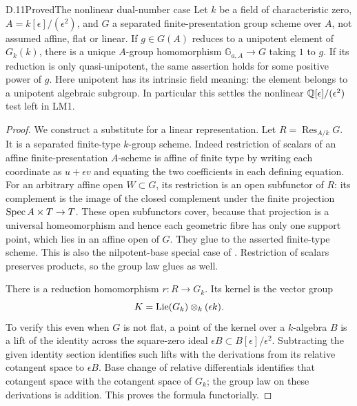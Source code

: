 \begin{statement}{D.11}{Proved}{The nonlinear dual-number case}
Let $k$ be a field of characteristic zero,
$A=k[\epsilon]/(\epsilon^2)$, and $G$ a separated
finite-presentation group scheme over $A$, not assumed
affine, flat or linear. If $g\in G(A)$ reduces to a
unipotent element of $G_k(k)$, there is a unique
$A$-group homomorphism $\mathbb G_{a,A}\to G$ taking $1$ to $g$.
If its reduction is only quasi-unipotent, the same
assertion holds for some positive power of $g$.
Here unipotent has its intrinsic field meaning:
the element belongs to a unipotent algebraic subgroup.
In particular this settles the nonlinear
$\mathbb Q[\epsilon]/(\epsilon^2)$ test left in LM1.
\end{statement}
\begin{proof}
We construct a substitute for a linear representation.
Let $R=\operatorname{Res}_{A/k}G$. It is a separated
finite-type $k$-group scheme. Indeed restriction of
scalars of an affine finite-presentation $A$-scheme
is affine of finite type by writing each coordinate
as $u+\epsilon v$ and equating the two coefficients
in each defining equation. For an arbitrary affine
open $W\subset G$, its restriction is an open
subfunctor of $R$: its complement is the image of
the closed complement under the finite projection
$\operatorname{Spec} A\times T\to T$. These open subfunctors cover,
because that projection is a universal homeomorphism
and hence each geometric fibre has only one support
point, which lies in an affine open of $G$.
They glue to the asserted finite-type scheme.
This is also the nilpotent-base special case of
\citet[Proposition 97.11.5, Tag 05Y8]{D_StacksRestriction}.
Restriction of scalars preserves products, so the
group law glues as well.

There is a reduction homomorphism $r:R\to G_k$.
Its kernel is the vector group
\[
 K=\operatorname{Lie}(G_k)\otimes_k(\epsilon k).
\]
To verify this even when $G$ is not flat, a point
of the kernel over a $k$-algebra $B$ is a lift of
the identity across the square-zero ideal
$\epsilon B\subset B[\epsilon]/\epsilon^2$.
Subtracting the given identity section identifies
such lifts with the derivations from its relative
cotangent space to $\epsilon B$. Base change of
relative differentials identifies that cotangent
space with the cotangent space of $G_k$; the group
law on these derivations is addition. This proves
the formula functorially.


\end{proof}
